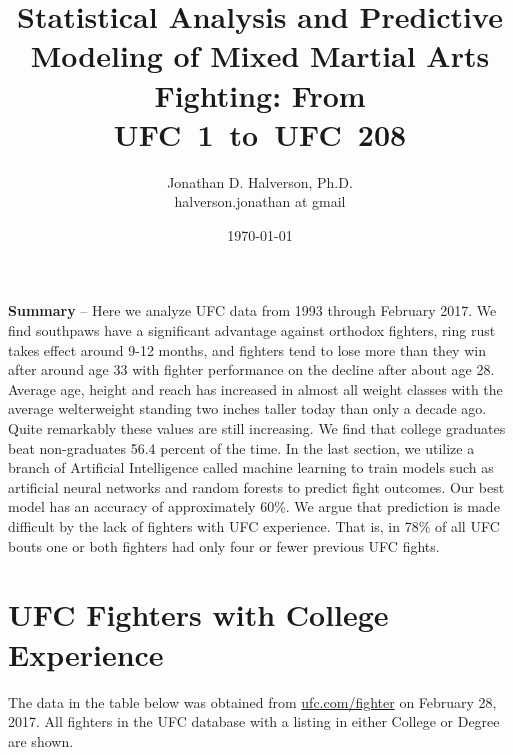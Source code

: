 \documentclass[12pt]{article}
\title{\Large\bfseries Statistical Analysis and Predictive Modeling of Mixed Martial Arts Fighting: From UFC~1~to~UFC~208}
\author{\large Jonathan D. Halverson, Ph.D.\\ \tiny halverson.jonathan at gmail}
\date{\large \today}
\begin{document}
\maketitle
\thispagestyle{fancy}
\noindent
\textbf{Summary} -- Here we analyze UFC data from 1993 through February 2017.
We find southpaws have a significant advantage against
orthodox fighters, ring rust takes effect around 9-12 months, and fighters tend to lose
more than they win after around age 33 with fighter performance on the decline after about age 28.
Average age, height and reach has increased in almost all weight classes
with the average welterweight standing two inches taller today than only a decade ago.
Quite remarkably these values are still increasing.
We find that college graduates beat non-graduates
56.4 percent of the time.
In the last section, we utilize
a branch of Artificial Intelligence called machine learning to
train models such as artificial neural networks and random forests to
predict fight outcomes. Our best model has an accuracy of approximately 60\%. We argue that
prediction is made difficult by the lack of fighters with UFC experience. 
That is, in 78\% of all UFC bouts one or both fighters had only four or fewer previous UFC fights.











\appendix


\section{UFC Fighters with College Experience}
\label{appendix_education}
The data in the table below was obtained from \url{ufc.com/fighter} on February 28, 2017.
All fighters in the UFC database with a listing in either College or Degree are shown.
\begin{center}

\end{center}

%
\end{document}

